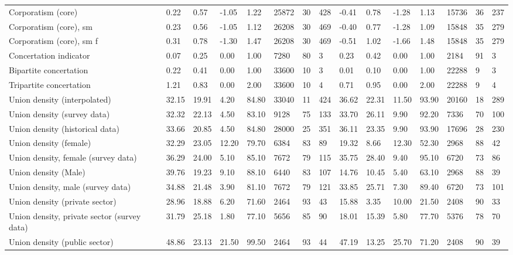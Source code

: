 \begin{longtable}{lllllllllllllll}
Corporatism (core) & 0.22 & 0.57 & -1.05 & 1.22 & 25872 & 30 & 428 & -0.41 & 0.78 & -1.28 & 1.13 & 15736 & 36 & 237\\
\addlinespace
Corporatism (core), sm & 0.23 & 0.56 & -1.05 & 1.12 & 26208 & 30 & 469 & -0.40 & 0.77 & -1.28 & 1.09 & 15848 & 35 & 279\\
Corporatism (core), sm f & 0.31 & 0.78 & -1.30 & 1.47 & 26208 & 30 & 469 & -0.51 & 1.02 & -1.66 & 1.48 & 15848 & 35 & 279\\
Concertation indicator & 0.07 & 0.25 & 0.00 & 1.00 & 7280 & 80 & 3 & 0.23 & 0.42 & 0.00 & 1.00 & 2184 & 91 & 3\\
Bipartite concertation & 0.22 & 0.41 & 0.00 & 1.00 & 33600 & 10 & 3 & 0.01 & 0.10 & 0.00 & 1.00 & 22288 & 9 & 3\\
Tripartite concertation & 1.21 & 0.83 & 0.00 & 2.00 & 33600 & 10 & 4 & 0.71 & 0.95 & 0.00 & 2.00 & 22288 & 9 & 4\\
\addlinespace
Union density (interpolated) & 32.15 & 19.91 & 4.20 & 84.80 & 33040 & 11 & 424 & 36.62 & 22.31 & 11.50 & 93.90 & 20160 & 18 & 289\\
Union density (survey data) & 32.32 & 22.13 & 4.50 & 83.10 & 9128 & 75 & 133 & 33.70 & 26.11 & 9.90 & 92.20 & 7336 & 70 & 100\\
Union density (historical data) & 33.66 & 20.85 & 4.50 & 84.80 & 28000 & 25 & 351 & 36.11 & 23.35 & 9.90 & 93.90 & 17696 & 28 & 230\\
Union density (female) & 32.29 & 23.05 & 12.20 & 79.70 & 6384 & 83 & 89 & 19.32 & 8.66 & 12.30 & 52.30 & 2968 & 88 & 42\\
Union density, female (survey data) & 36.29 & 24.00 & 5.10 & 85.10 & 7672 & 79 & 115 & 35.75 & 28.40 & 9.40 & 95.10 & 6720 & 73 & 86\\
\addlinespace
Union density (Male) & 39.76 & 19.23 & 9.10 & 88.10 & 6440 & 83 & 107 & 14.76 & 10.45 & 5.40 & 63.10 & 2968 & 88 & 39\\
Union density, male (survey data) & 34.88 & 21.48 & 3.90 & 81.10 & 7672 & 79 & 121 & 33.85 & 25.71 & 7.30 & 89.40 & 6720 & 73 & 101\\
Union density (private sector) & 28.96 & 18.88 & 6.20 & 71.60 & 2464 & 93 & 43 & 15.88 & 3.35 & 10.00 & 21.50 & 2408 & 90 & 33\\
Union density, private sector (survey data) & 31.79 & 25.18 & 1.80 & 77.10 & 5656 & 85 & 90 & 18.01 & 15.39 & 5.80 & 77.70 & 5376 & 78 & 70\\
Union density (public sector) & 48.86 & 23.13 & 21.50 & 99.50 & 2464 & 93 & 44 & 47.19 & 13.25 & 25.70 & 71.20 & 2408 & 90 & 39\\

\end{longtable}
